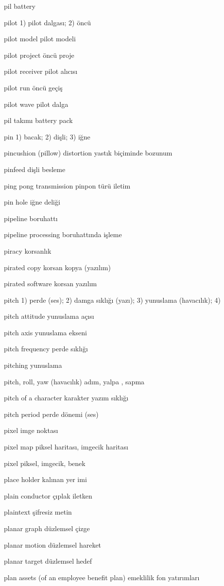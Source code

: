\documentclass[12pt,fleqn]{article}\usepackage{../../common}
\begin{document}
pil battery

pilot 1) pilot dalgası; 2) öncü

pilot model pilot modeli

pilot project öncü proje

pilot receiver pilot alıcısı

pilot run öncü geçiş

pilot wave pilot dalga

pil takımı battery pack

pin 1) bacak; 2) dişli; 3) iğne

pincushion (pillow) distortion yastık biçiminde bozunum

pinfeed dişli besleme

ping pong transmission pinpon türü iletim

pin hole iğne deliği

pipeline boruhattı

pipeline processing boruhattında işleme

piracy korsanlık

pirated copy korsan kopya (yazılım)

pirated software korsan yazılım

pitch 1) perde (ses); 2) damga sıklığı (yazı); 3) yunuslama (havacılık); 4)

pitch attitude yunuslama açısı

pitch axis yunuslama ekseni

pitch frequency perde sıklığı

pitching yunuslama

pitch, roll, yaw (havacılık) adım, yalpa , sapma

pitch of a character karakter yazım sıklığı

pitch period perde dönemi (ses)

pixel imge noktası

pixel map piksel haritası, imgecik haritası

pixel piksel, imgecik, benek

place holder kalınan yer imi

plain conductor çıplak iletken

plaintext şifresiz metin

planar graph düzlemsel çizge

planar motion düzlemsel hareket

planar target düzlemsel hedef

plan assets (of an employee benefit plan) emeklilik fon yatırımları
\end{document}
